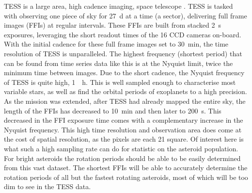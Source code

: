 \documentclass{UCreport}
\begin{document}
TESS is a large area, high cadence imaging, space telescope  \citep{Ricker2014}.
TESS is tasked with observing one piece of sky for \qty{27}{\day} at a time (a sector), delivering  full frame images (FFIs) at regular intervals.
These FFIs are built from stacked \qty{2}{\second} exposures, leveraging the short readout times of the 16 CCD cameras on-board.
With the initial cadence for these full frame images set to \qty{30}{\minute}, the time resolution of TESS is unparalleled.
The highest frequency (shortest period) that can be found from time series data like this is at the Nyquist limit, twice the minimum time between images.
Due to the short cadence, the Nyquist frequency of TESS is quite high, \qty{1}{\per\hour}.
This is well sampled enough to characterise most variable stars, as well as find the orbital periods of exoplanets to a high precision.
As the mission was extended, after TESS had already mapped the entire sky, the length of the FFIs has decreased to \qty{10}{\minute} and then later to \qty{200}{\second}.
This decreased in the FFI exposure time comes with a complementary increase in the Nyquist frequency.
This high time resolution and observation area does come at the cost of spatial resolution, as the pixels are each \qty{21}{\arcsec} square.
Of interest here is what such a high sampling rate can do for statistic on the asteroid population.
For bright asteroids the rotation periods should be able to be easily determined from this vast dataset.
The shortest FFIs will be able to accurately determine the rotation periods of all but the fastest rotating asteroids, most of which will be too dim to see in the TESS data.
\end{document}
